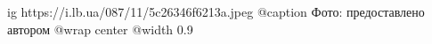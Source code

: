  
 
 
 
 

\ifcmt
  ig https://i.lb.ua/087/11/5c26346f6213a.jpeg
	@caption Фото: предоставлено автором
  @wrap center
  @width 0.9
\fi
